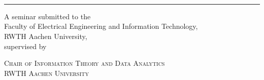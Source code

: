 \begin{raggedleft}

{ \titlefont

\renewcommand{\baselinestretch}{1.40}\normalsize
{\emphtitleline \MakeUppercase{\titlelineB}} \\
{\nonemphtitleline \MakeUppercase{\titlelineC}} \\[0.25\baselineskip] 
{\emphtitleline \MakeUppercase{\titlelineD}} \\
}

\vspace{0.15\drop} %
\rule{0.3\textwidth}{0.4pt}\par %
\vspace{\drop} %

\makeatletter
{\Large \textsc{\@author}}\par %
\makeatother

\end{raggedleft}

\vspace{2\drop}

\begin{flushleft}
A seminar submitted to the \\
\textsf{Faculty of Electrical Engineering and Information Technology},\\
\textsf{RWTH Aachen University},\\[0.5\baselineskip]
supervised by \textsf{\supervisor}\\[0.5\baselineskip]
\end{flushleft}

\vfill %
\vspace*{30mm}
{\large \textsc{Chair of Information Theory and Data Analytics}}\\[0.5\baselineskip] %
{\large \textsc{RWTH Aachen University}}\par %
%
%
\twolinesbottom
\endgroup

\cleardoublepage

